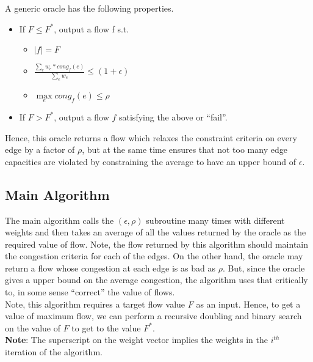 \documentclass[BTech]{iitmdiss}
\begin{document}
	    A generic oracle has the following properties.
	    \begin{itemize}
	     \item 
	      If $F \leq F^{\ast}$, output a flow f s.t. \\
	      
		\begin{itemize}
		 \item 
		    $|f| = F$ \\
		 \item
		    $\frac{\sum\limits_{e} w_e \ast cong_f(e)}{\sum\limits_{e} w_e} \leq (1+\epsilon)$ \\
		 \item
		    $\max\limits_{e} cong_f(e) \leq \rho$ \\
		\end{itemize}

	     \item
		If $F > F^{\ast}$, output a flow $f$ satisfying the above or ``fail''.
	  \end{itemize}
	    Hence, this oracle returns a flow which relaxes the constraint criteria on every edge by a factor of $\rho$, but at the same time ensures
	    that not too many edge capacities are violated by constraining the average to have an upper bound of $\epsilon$.
	    
	  \subsection{Main Algorithm}
	      The main algorithm calls the $(\epsilon,\rho)$ subroutine many times with different weights and then takes an average of all the values
	      returned by the oracle as the required value of flow. Note, the flow returned by this algorithm should maintain the congestion criteria
	      for each of the edges. On the other hand, the oracle may return a flow whose congestion at each edge is as bad as $\rho$. But, since
	      the oracle gives a upper bound on the average congestion, the algorithm uses that critically to, in some sense ``correct'' the value of 
	      flows. \\
	      
	      Note, this algorithm requires a target flow value $F$ as an input. Hence, to get a value of maximum flow, we can perform a recursive
	      doubling and binary search on the value of $F$ to get to the value $F^{\ast}$. \\
	      
	      \textbf{Note}: The superscript on the weight vector implies the weights in the $i^{th}$ iteration of the algorithm. \\
	      
\end{document}
